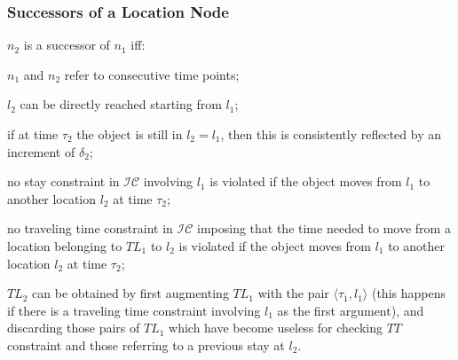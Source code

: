 
\begin{frame}
\frametitle{Successors of a Location Node}

$n_2$ is a successor of $n_1$ iff:

\begin{fitemize}
  \item $n_1$ and $n_2$ refer to consecutive time points;
  \item $l_2$ can be directly reached starting from $l_1$;
  \item if at time $\tau_2$ the object is still in $l_2 = l_1$, then this is consistently reflected by an increment of $\delta_2$;
  \item no stay constraint in $\mathcal{IC}$ involving $l_1$ is violated if the object moves from $l_1$ to another location $l_2$ at time $\tau_2$;
  \item no traveling time constraint in $\mathcal{IC}$ imposing that the time needed to move from a location belonging to $TL_1$ to $l_2$ is violated if the object moves from $l_1$ to another location $l_2$ at time $\tau_2$;
  \item $TL_2$ can be obtained by first augmenting $TL_1$ with the pair $\langle \tau_1, l_1 \rangle$ (this happens if there is a traveling time constraint involving $l_1$ as the first argument), and discarding those pairs of $TL_1$ which have become useless for checking $TT$ constraint and those referring to a previous stay at $l_2$.
\end{fitemize}

\end{frame}


